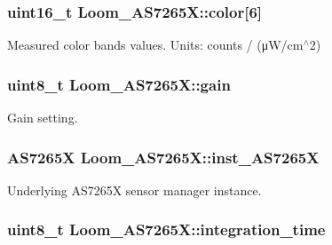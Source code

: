 \subsubsection[{\texorpdfstring{color}{color}}]{\setlength{\rightskip}{0pt plus 5cm}uint16\+\_\+t Loom\+\_\+\+A\+S7265\+X\+::color\mbox{[}6\mbox{]}\hspace{0.3cm}{\ttfamily [protected]}}\hypertarget{class_loom___a_s7265_x_aaf555d167aca2607fa0f13c71341f3b1}{}\label{class_loom___a_s7265_x_aaf555d167aca2607fa0f13c71341f3b1}


Measured color bands values. Units\+: counts / (μ\+W/cm$^\wedge$2) 

\subsubsection[{\texorpdfstring{gain}{gain}}]{\setlength{\rightskip}{0pt plus 5cm}uint8\+\_\+t Loom\+\_\+\+A\+S7265\+X\+::gain\hspace{0.3cm}{\ttfamily [protected]}}\hypertarget{class_loom___a_s7265_x_a204831caa774ead3b9ba57495e17bfd9}{}\label{class_loom___a_s7265_x_a204831caa774ead3b9ba57495e17bfd9}


Gain setting. 

\subsubsection[{\texorpdfstring{inst\+\_\+\+A\+S7265X}{inst_AS7265X}}]{\setlength{\rightskip}{0pt plus 5cm}A\+S7265X Loom\+\_\+\+A\+S7265\+X\+::inst\+\_\+\+A\+S7265X\hspace{0.3cm}{\ttfamily [protected]}}\hypertarget{class_loom___a_s7265_x_a929b53e4170b78bfe3ca8787525dc4e7}{}\label{class_loom___a_s7265_x_a929b53e4170b78bfe3ca8787525dc4e7}


Underlying A\+S7265X sensor manager instance. 

\subsubsection[{\texorpdfstring{integration\+\_\+time}{integration_time}}]{\setlength{\rightskip}{0pt plus 5cm}uint8\+\_\+t Loom\+\_\+\+A\+S7265\+X\+::integration\+\_\+time\hspace{0.3cm}{\ttfamily [protected]}}\hypertarget{class_loom___a_s7265_x_a656e32aedff07ca33e3b9b0dc2768ba8}{}\label{class_loom___a_s7265_x_a656e32aedff07ca33e3b9b0dc2768ba8}


